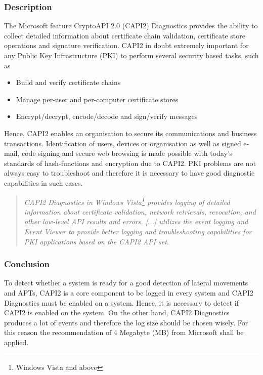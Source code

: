 \subsubsection{Description}
The Microsoft feature CryptoAPI 2.0 (CAPI2) Diagnostics provides the ability to collect detailed information about certificate chain validation, certificate store operations and signature verification. CAPI2 in doubt extremely important for any Public Key Infrastructure (PKI) to perform several security based tasks, such as
\begin{itemize}
    \item Build and verify certificate chains
    \item Manage per-user and per-computer certificate stores
    \item Encrypt/decrypt, encode/decode and sign/verify messages
\end{itemize}
Hence, CAPI2 enables an organisation to secure its communications and business transactions. Identification of users, devices or organisation as well as signed e-mail, code signing and secure web browsing is made possible with today's standards of hash-functions and encryption due to CAPI2. PKI problems are not always easy to troubleshoot and therefore it is necessary to have good diagnostic capabilities in such cases. 
\begin{quotation}
    \textit{CAPI2 Diagnostics in Windows Vista\footnote{Windows Vista and above} provides logging of detailed information about certificate validation, network retrievals, revocation, and other low-level API results and errors. [...] utilizes the event logging and Event Viewer to provide better logging and troubleshooting capabilities for PKI applications based on the CAPI2 API set. \cite{CAPI2}}
\end{quotation}
\subsubsection{Conclusion}
To detect whether a system is ready for a good detection of lateral movements and APTs, CAPI2 is a core component to be logged in every system and CAPI2 Diagnostics must be enabled on a system. Hence, it is necessary to detect if CAPI2 is enabled on the system. On the other hand, CAPI2 Diagnostics produces a lot of events and therefore the log size should be chosen wisely. For this reason the recommendation of 4 Megabyte (MB) from Microsoft shall be applied. \cite{CAPI2}


\clearpage

